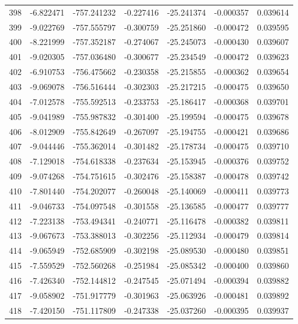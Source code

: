 \begin{tabular}{rrrrrrr}
 398 &  -6.822471 & -757.241232 & -0.227416 &  -25.241374 &   -0.000357 &  0.039614 \\
 399 &  -9.022769 & -757.555797 & -0.300759 &  -25.251860 &   -0.000472 &  0.039595 \\
 400 &  -8.221999 & -757.352187 & -0.274067 &  -25.245073 &   -0.000430 &  0.039607 \\
 401 &  -9.020305 & -757.036480 & -0.300677 &  -25.234549 &   -0.000472 &  0.039623 \\
 402 &  -6.910753 & -756.475662 & -0.230358 &  -25.215855 &   -0.000362 &  0.039654 \\
 403 &  -9.069078 & -756.516444 & -0.302303 &  -25.217215 &   -0.000475 &  0.039650 \\
 404 &  -7.012578 & -755.592513 & -0.233753 &  -25.186417 &   -0.000368 &  0.039701 \\
 405 &  -9.041989 & -755.987832 & -0.301400 &  -25.199594 &   -0.000475 &  0.039678 \\
 406 &  -8.012909 & -755.842649 & -0.267097 &  -25.194755 &   -0.000421 &  0.039686 \\
 407 &  -9.044446 & -755.362014 & -0.301482 &  -25.178734 &   -0.000475 &  0.039710 \\
 408 &  -7.129018 & -754.618338 & -0.237634 &  -25.153945 &   -0.000376 &  0.039752 \\
 409 &  -9.074268 & -754.751615 & -0.302476 &  -25.158387 &   -0.000478 &  0.039742 \\
 410 &  -7.801440 & -754.202077 & -0.260048 &  -25.140069 &   -0.000411 &  0.039773 \\
 411 &  -9.046733 & -754.097548 & -0.301558 &  -25.136585 &   -0.000477 &  0.039777 \\
 412 &  -7.223138 & -753.494341 & -0.240771 &  -25.116478 &   -0.000382 &  0.039811 \\
 413 &  -9.067673 & -753.388013 & -0.302256 &  -25.112934 &   -0.000479 &  0.039814 \\
 414 &  -9.065949 & -752.685909 & -0.302198 &  -25.089530 &   -0.000480 &  0.039851 \\
 415 &  -7.559529 & -752.560268 & -0.251984 &  -25.085342 &   -0.000400 &  0.039860 \\
 416 &  -7.426340 & -752.144812 & -0.247545 &  -25.071494 &   -0.000394 &  0.039882 \\
 417 &  -9.058902 & -751.917779 & -0.301963 &  -25.063926 &   -0.000481 &  0.039892 \\
 418 &  -7.420150 & -751.117809 & -0.247338 &  -25.037260 &   -0.000395 &  0.039937 \\

\end{tabular}
